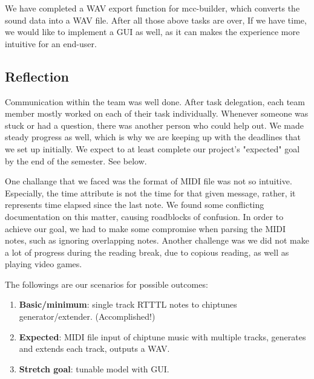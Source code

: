 \documentclass{article}
\begin{document}
We have completed a WAV export function for mcc-builder, which converts the sound data into a WAV file. After all those above tasks are over, If we have time, we would like 
to implement a GUI as well, as it can makes the experience more intuitive for an end-user. 

\subsection{Reflection}
Communication within the team was well done. After task delegation, each team member mostly worked on each of their task individually. Whenever someone was stuck or had 
a question, there was another person who could help out. We made steady progress as well, which is why we are keeping up with the deadlines that we set up initially. We 
expect to at least complete our project's "expected" goal by the end of the semester. See below.

One challange that we faced was the format of MIDI file was not so intuitive. Especially, the time attribute is not the time for that given message, rather, it represents 
time elapsed since the last note. We found some conflicting documentation on this matter, causing roadblocks of confusion. In order to achieve our goal, we had to make some 
compromise when parsing the MIDI notes, such as ignoring overlapping notes. Another challenge was we did not make a lot of progress during the reading break, due to 
copious reading, as well as playing video games.

The followings are our scenarios for possible outcomes:
\begin{enumerate}
  \item \textbf{Basic/minimum}: single track RTTTL notes to chiptunes generator/extender. (Accomplished!)
  \item \textbf{Expected}: MIDI file input of chiptune music with multiple tracks, generates and extends each track, outputs a WAV.
  \item \textbf{Stretch goal}: tunable model with GUI.
\end{enumerate}



\end{document}
